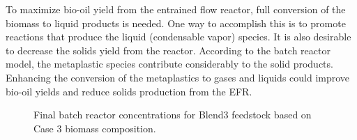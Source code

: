 To maximize bio-oil yield from the entrained flow reactor, full conversion of the biomass to liquid products is needed. One way to accomplish this is to promote reactions that produce the liquid (condensable vapor) species. It is also desirable to decrease the solids yield from the reactor. According to the batch reactor model, the metaplastic species contribute considerably to the solid products. Enhancing the conversion of the metaplastics to gases and liquids could improve bio-oil yields and reduce solids production from the EFR.

\begin{figure}[H]
    \caption{Final batch reactor concentrations for Blend3 feedstock based on Case 3 biomass composition.}
    \label{fig:blend3-case3-final}
\end{figure}

